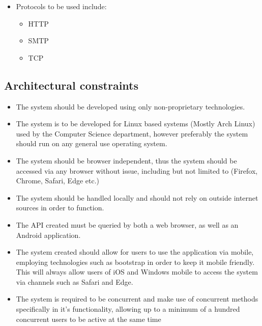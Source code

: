 \documentclass{article}
\begin{document}
	
	\begin{itemize}
		\item Protocols to be used include:
		\begin{itemize}
			\item HTTP
			\item SMTP
			\item TCP
		\end{itemize}
	\end{itemize}
	
	\cleardoublepage
	
	\subsection{Architectural constraints}\label{subsec:constraints}
	\begin{itemize}
		\item The system should be developed using only non-proprietary technologies.
		\item The system is to be developed for Linux based systems (Mostly Arch Linux) used by the Computer Science department, however preferably the system should run on any general use operating system.
		\item The system should be browser independent, thus the system should be accessed via any browser without issue, including but not limited to (Firefox, Chrome, Safari, Edge etc.)
		\item The system should be handled locally and should not rely on outside internet sources in order to function.
		\item The API created must be queried by both a web browser, as well as an Android application.
		\item The system created should allow for users to use the application via mobile, employing technologies such as bootstrap in order to keep it mobile friendly. This will always allow users of iOS and Windows mobile to access the system via channels such as Safari and Edge.
		\item The system is required to be concurrent and make use of concurrent methods specifically in it's functionality, allowing up to a minimum of a hundred concurrent users to be active at the same time
	\end{itemize}
	
	
\end{document}
